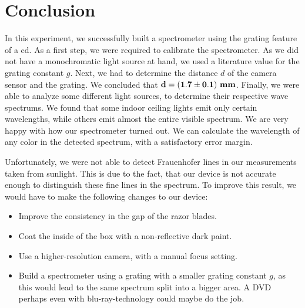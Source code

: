 \section{Conclusion}
    In this experiment, we successfully built a spectrometer using the grating feature of a cd.
    As a first step, we were required to calibrate the spectrometer.
    As we did not have a monochromatic light source at hand, we used a literature value for the grating
    constant $g$. Next, we had to determine the distance $d$ of the camera sensor and the grating.
    We concluded that $\bf d = (1.7 \pm 0.1) ~\si{\bf\milli\meter}$.
    Finally, we were able to analyze some different light sources, to determine their respective wave spectrums.
    We found that some indoor ceiling lights emit only certain wavelengths, while others emit almost the entire
    visible spectrum.
    We are very happy with how our spectrometer turned out. We can calculate the wavelength of any color
    in the detected spectrum, with a satisfactory error margin.

    Unfortunately, we were not able to detect Frauenhofer lines in our measurements taken from sunlight.
    This is due to the fact, that our device is not accurate enough to distinguish these fine lines in the spectrum.
    To improve this result, we would have to make the following changes to our device:
    \begin{itemize}
        \item Improve the consistency in the gap of the razor blades.
        \item Coat the inside of the box with a non-reflective dark paint.
        \item Use a higher-resolution camera, with a manual focus setting.
        \item Build a spectrometer using a grating with a smaller grating constant $g$, as this would lead to the same spectrum split into a bigger area.
            A DVD perhaps even with blu-ray-technology could maybe do the job.
    \end{itemize}

